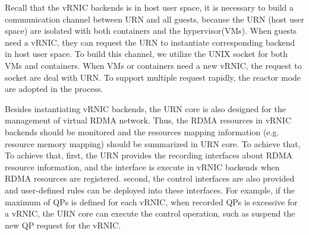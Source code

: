 Recall that the vRNIC backends is in host user space, it is necessary to build a communication channel between URN and all guests, because the URN (host user space) are isolated with both containers and the hypervisor(VMs). When guests need a vRNIC, they can request the URN to instantiate corresponding backend in host user space. To build this channel, we utilize the UNIX socket for both VMs and containers. When VMs or containers need a new vRNIC, the request to socket are deal with URN. To support multiple request rapidly, the reactor mode are adopted in the process.

Besides instantiating vRNIC backends, the URN core is also designed for the management of virtual RDMA network. Thus, the RDMA resources in vRNIC backends should be monitored and the resources mapping information (e.g. resource memory mapping) should be summarized in URN core. To achieve that, 
To achieve that, first, the URN provides the recording interfaces about RDMA resource information, and the interface is execute in vRNIC backends when RDMA resources are registered. second, the control interfaces are also provided and user-defined rules can be deployed into these interfaces. For example, if the maximum of QPs is defined for each vRNIC, when recorded QPs is excessive for a vRNIC, the URN core can execute the control operation, such as suspend the new QP request for the vRNIC.

